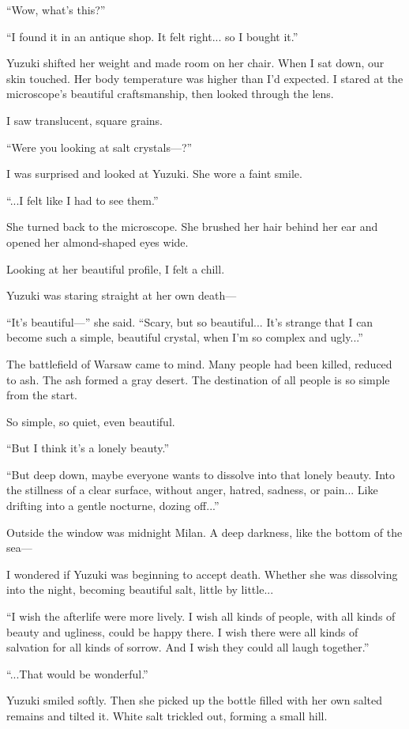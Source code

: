 \documentclass[
    a4paper,
    12pt,
    twoside,
    openany,
    UTF8,
    fontset=windows
]{ctexbook}
\begin{document}
``Wow, what's this?''

``I found it in an antique shop. It felt right... so I bought it.''

Yuzuki shifted her weight and made room on her chair. When I sat down, our skin touched. Her body temperature was higher than I'd expected. I stared at the microscope's beautiful craftsmanship, then looked through the lens.

I saw translucent, square grains.

``Were you looking at salt crystals---?''

I was surprised and looked at Yuzuki. She wore a faint smile.

``...I felt like I had to see them.''

She turned back to the microscope. She brushed her hair behind her ear and opened her almond-shaped eyes wide.

Looking at her beautiful profile, I felt a chill.

Yuzuki was staring straight at her own death---

``It's beautiful---'' she said. ``Scary, but so beautiful... It's strange that I can become such a simple, beautiful crystal, when I'm so complex and ugly...''

The battlefield of Warsaw came to mind. Many people had been killed, reduced to ash. The ash formed a gray desert. The destination of all people is so simple from the start.

So simple, so quiet, even beautiful.

``But I think it's a lonely beauty.''

``But deep down, maybe everyone wants to dissolve into that lonely beauty. Into the stillness of a clear surface, without anger, hatred, sadness, or pain... Like drifting into a gentle nocturne, dozing off...''

Outside the window was midnight Milan. A deep darkness, like the bottom of the sea---

I wondered if Yuzuki was beginning to accept death. Whether she was dissolving into the night, becoming beautiful salt, little by little...

``I wish the afterlife were more lively. I wish all kinds of people, with all kinds of beauty and ugliness, could be happy there. I wish there were all kinds of salvation for all kinds of sorrow. And I wish they could all laugh together.''

``...That would be wonderful.''

Yuzuki smiled softly. Then she picked up the bottle filled with her own salted remains and tilted it. White salt trickled out, forming a small hill.
\end{document}
